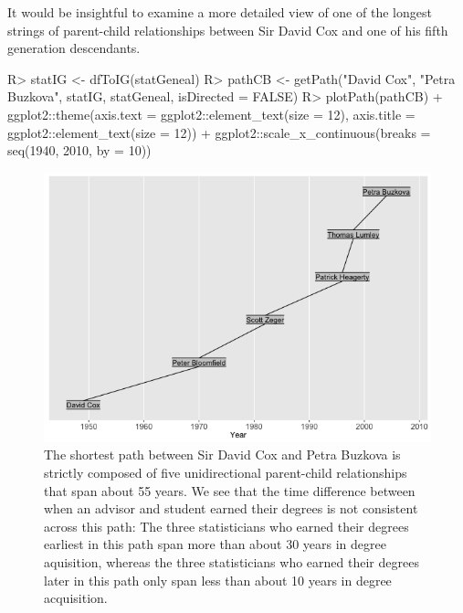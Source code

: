 \documentclass[article,shortnames]{jss}
\begin{document}
It would be insightful to examine a more detailed view of one of the longest strings of parent-child relationships between Sir David Cox and one of his fifth generation descendants. 

\begin{CodeChunk}
\begin{CodeInput}
R> statIG <- dfToIG(statGeneal)
R> pathCB <- getPath("David Cox", "Petra Buzkova", statIG, statGeneal, isDirected
  = FALSE)
R> plotPath(pathCB) + ggplot2::theme(axis.text = ggplot2::element_text(size
  = 12), axis.title = ggplot2::element_text(size = 12)) +
  ggplot2::scale_x_continuous(breaks = seq(1940, 2010, by = 10))
\end{CodeInput}
\end{CodeChunk}

\begin{figure}[h]
    \centering
    \includegraphics[width=\textwidth]{pathCB}
    \caption{The shortest path between Sir David Cox and Petra Buzkova is strictly composed of five unidirectional parent-child relationships that span about 55 years. We see that the time difference between when an advisor and student earned their degrees is not consistent across this path: The three statisticians who earned their degrees earliest in this path span more than about 30 years in degree aquisition, whereas the three statisticians who earned their degrees later in this path only span less than about 10 years in degree acquisition.}
    \label{fig:pathCB}
\end{figure}
\end{document}
